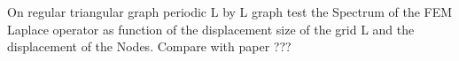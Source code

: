 On regular triangular graph periodic L by L graph test the Spectrum of the FEM Laplace operator as function of the displacement  size of the grid L and the
displacement of the Nodes. Compare with paper  ???